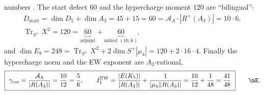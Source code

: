 \documentclass[11pt,a4paper]{article}
\newcommand{\AL}{\mathcal A_\Lambda}
\newcommand{\Dstart}{D_{\mathrm{start}}}
\theoremstyle{definition}
\begin{document}
numbers \mE. The start defect
$60$ and the hypercharge moment $120$ are ``bilingual'':
\begin{equation}
\begin{gathered}
  \Dstart=\dim D_5+\dim A_3=45+15=60=\AL\cdot|R^+(A_3)|=10\cdot6,\\[2pt]
  \operatorname{Tr}_{S^+}X^2=120=\underbrace{60}_{\text{adjoint}}+\underbrace{60}_{\text{mixed }(10,6)} ,
\end{gathered}
\end{equation}
and $\dim E_8=248=\operatorname{Tr}_{S^+}X^2+2\dim S^+|\mu_4|=120+2\cdot16\cdot4$. Finally the
hypercharge norm and the EW exponent are $A_3$-rational,
\begin{equation}
  \boxed{\ \gamma_{\mathrm{car}}=\frac{\AL}{|R(A_3)|}=\frac{10}{12}=\frac56,\qquad
  I_1^{\mathrm{EW}}=\frac{|E(K_5)|}{|R(A_3)|}+\frac{1}{|\mu_4||R(A_3)|}=\frac{10}{12}+\frac1{48}=\frac{41}{48}\ }\qquad\mE .
\end{equation}
\end{document}
